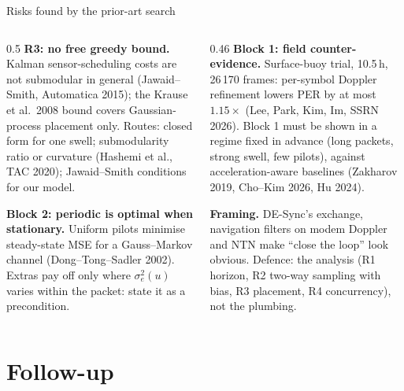 \documentclass[aspectratio=169,11pt]{beamer}
\begin{document}
\begin{frame}{Risks found by the prior-art search}
\begin{columns}[T]
\begin{column}{0.5\textwidth}
\footnotesize
\textbf{R3: no free greedy bound.} Kalman sensor-scheduling costs are not submodular in general (Jawaid--Smith, Automatica 2015); the Krause et al.\ 2008 bound covers Gaussian-process placement only. Routes: closed form for one swell; submodularity ratio or curvature (Hashemi et al., TAC 2020); Jawaid--Smith conditions for our model.

\medskip
\textbf{Block 2: periodic is optimal when stationary.} Uniform pilots minimise steady-state MSE for a Gauss--Markov channel (Dong--Tong--Sadler 2002). Extras pay off only where $\sigma_e^2(u)$ varies within the packet: state it as a precondition.
\end{column}
\begin{column}{0.46\textwidth}
\footnotesize
\textbf{Block 1: field counter-evidence.} Surface-buoy trial, 10.5\,h, 26\,170 frames: per-symbol Doppler refinement lowers PER by at most $1.15\times$ (Lee, Park, Kim, Im, SSRN 2026). Block 1 must be shown in a regime fixed in advance (long packets, strong swell, few pilots), against acceleration-aware baselines (Zakharov 2019, Cho--Kim 2026, Hu 2024).

\medskip
\textbf{Framing.} DE-Sync's exchange, navigation filters on modem Doppler and NTN make ``close the loop'' look obvious. Defence: the analysis (R1 horizon, R2 two-way sampling with bias, R3 placement, R4 concurrency), not the plumbing.
\end{column}
\end{columns}
\end{frame}

\section{Follow-up}
\end{document}
